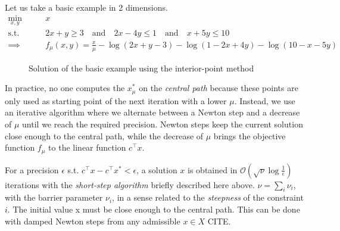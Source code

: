 \documentclass[11 pt]{report}
\begin{document}
Let us take a basic example in 2 dimensions.
\begin{equation*}
\begin{aligned}
    \min_{x,y} \qquad &x\\
    \text{s.t.} \qquad & 2x + y \geq 3 \quad\text{and}\quad 2x - 4y \leq 1 \quad\text{and}\quad x + 5y \leq 10\\
    \implies \qquad & f_{\mu}(x,y) = \frac{x}{\mu} - \log(2x+y-3) - \log(1-2x+4y) - \log(10 - x - 5y)
\end{aligned}
\end{equation*}

\begin{figure}[ht]
    \centering
    
    \caption{Solution of the basic example using the interior-point method}
    \label{fig:interior_pt}
\end{figure}

In practice, no one computes the $x^*_{\mu}$ on the \textit{central path} because these points are only used as starting point of the next iteration with a lower $\mu$. Instead, we use an iterative algorithm where we alternate between a Newton step and a decrease of $\mu$ until we reach the required precision. Newton steps keep the current solution close enough to the central path, while the decrease of $\mu$ brings the objective function $f_{\mu}$ to the linear function $c^\top x$. 

For a precision $\epsilon$ s.t. $c^\top x - c^\top x^* < \epsilon$, a solution $x$ is obtained in $\mathcal{O}(\sqrt{\nu} \log \frac{1}{\epsilon})$ iterations with the \textit{short-step algorithm} briefly described here above. $\nu = \sum_{i} \nu_i$, with the barrier parameter $\nu_i$, in a sense related to the \textit{steepness} of the constraint $i$. The initial value x must be close enough to the central path. This can be done with damped Newton steps from any admissible $x \in X$ CITE.
\end{document}

